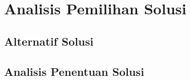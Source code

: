 \section{Analisis Pemilihan Solusi}
\label{sec:analisis-pemilihan-solusi}

\subsection{Alternatif Solusi}
\label{subsec:alternatif-solusi}

\subsection{Analisis Penentuan Solusi}
\label{subsec:analisis-penentuan-solusi}